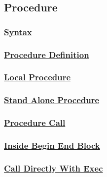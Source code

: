 \vspace{0.5cm}
\subsection{Procedure}

\subsubsection*{\underline{Syntax}}

\subsubsection*{\underline{Procedure Definition}}

\subsubsection*{\underline{Local Procedure}}





\subsubsection*{\underline{Stand Alone Procedure}}



\newpage
\subsubsection*{\underline{Procedure Call}}

\subsubsection*{\underline{Inside Begin End Block}}



\subsubsection*{\underline{Call Directly With Exec}}




